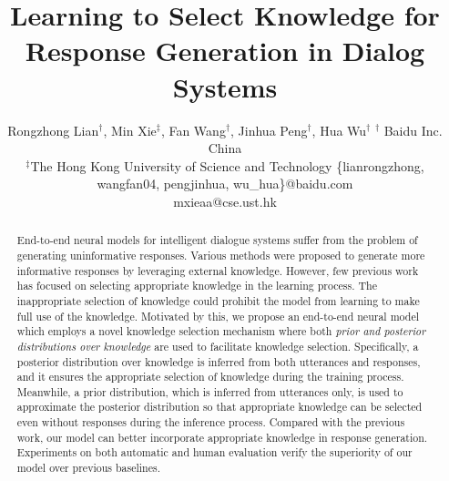 \documentclass{article}
\title{Learning to Select Knowledge for Response Generation in Dialog Systems}
\author{
Rongzhong Lian$^\dag$, Min Xie$^\ddag$, Fan Wang$^\dag$, Jinhua Peng$^\dag$, Hua Wu$^\dag$
\affiliations
  $^\dag$ Baidu Inc. China \\
  $^\ddag$The Hong Kong University of Science and Technology
\emails
  {\{lianrongzhong, wangfan04, pengjinhua, wu\_hua\}@baidu.com} \\
  mxieaa@cse.ust.hk
  }
\begin{document}
\maketitle
\begin{abstract}
  End-to-end neural models for intelligent dialogue systems suffer from the problem of generating uninformative responses.
  Various methods were proposed to generate more informative responses by leveraging external knowledge. 
  However, %
  few previous work has focused on selecting appropriate knowledge in the learning process.
  The inappropriate selection of knowledge could prohibit the model from learning to make full
 use of the knowledge.
  Motivated by this, 
  we propose an end-to-end neural model which employs a novel knowledge selection mechanism
  where both \emph{prior and posterior distributions over knowledge} are used to facilitate knowledge selection.
  Specifically, a posterior distribution over knowledge is inferred from both utterances and responses, and 
  it ensures the appropriate selection of knowledge during the training process. 
  Meanwhile, a prior distribution, which is inferred from utterances only,  is used to
  approximate the posterior distribution 
  so that appropriate knowledge can be selected even without responses during the inference process.
  Compared with the previous work, %
  our model can better incorporate appropriate knowledge in response generation.
  Experiments on both automatic and human evaluation verify
  the superiority of our model over previous baselines.
\end{abstract}
\end{document}
